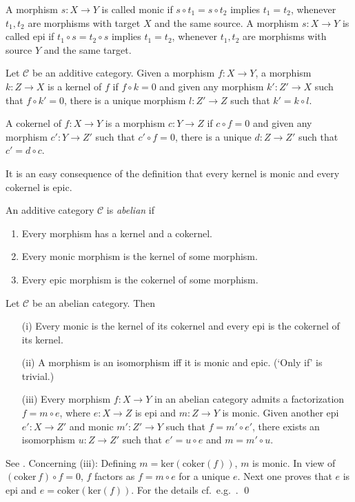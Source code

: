 \documentclass[11pt]{article}
\theoremstyle{definition}
\theoremstyle{definition}
\theoremstyle{remark}
\def\2#1{{\mathcal #1}}
\newcommand{\rarr}{\rightarrow}
\begin{document}
\bdefin {}
A morphism $s:X\rarr Y$ is called monic if $s\circ t_1=s\circ t_2$ implies $t_1=t_2$, whenever
$t_1,t_2$ are morphisms with target $X$ and the same source.
A morphism $s:X\rarr Y$ is called epi if $t_1\circ s=t_2\circ s$ implies $t_1=t_2$, whenever
$t_1,t_2$ are morphisms with source $Y$ and the same target.
\edefin

\bdefin {}
Let $\2C$ be an additive category. Given a morphism $f:X\rarr Y$, a morphism $k: Z\rarr X$ is a
kernel of $f$ if $f\circ k=0$ and given any morphism $k': Z'\rarr X$ such that $f\circ k'=0$, there
is a unique morphism $l:Z'\rarr Z$ such that $k'=k\circ l$.

A cokernel  of $f:X\rarr Y$ is a morphism $c: Y\rarr Z$ if $c\circ f=0$ and given any morphism 
$c': Y\rarr Z'$ such that $c'\circ f=0$, there is a unique $d: Z\rarr Z'$ such that $c'=d\circ c$.
\edefin

It is an easy consequence of the definition that every kernel is monic and every cokernel is epic.

\bdefin \label{def-abelian} 
An additive category $\2C$ is \emph{abelian} if
\begin{enumerate}
\item Every morphism has a kernel and a cokernel.
\item Every monic morphism is the kernel of some morphism.
\item Every epic morphism is the cokernel of some morphism.
\end{enumerate}
\edefin

\bprop \label{prop-me} Let $\2C$ be an abelian category. Then
\begin{itemize}
\item[(i)] Every monic is the kernel of its cokernel and every epi is the cokernel of its kernel.
\item[(ii)] A morphism is an isomorphism iff it is monic and epic. (`Only if' is trivial.)
\item[(iii)] Every morphism $f:X\rarr Y$ in an abelian category admits a factorization $f=m\circ e$,
where  $e:X\rarr Z$ is epi and  $m:Z\rarr Y$ is monic. Given another epi $e':X\rarr Z'$ and monic
$m':Z'\rarr Y$ such that $f=m'\circ e'$, there exists an isomorphism $u:Z\rarr Z'$ such that
$e'=u\circ e$ and $m=m'\circ u$.  
\end{itemize}
\eprop

\prf See \cite[Chapter VIII]{cwm}. Concerning (iii): Defining $m=\mathrm{ker}(\mathrm{coker}(f))$,
$m$ is monic. In view of $(\mathrm{coker}\,f)\circ f=0$, $f$ factors as $f=m\circ e$ for a unique
$e$. Next one proves that $e$ is epi and $e=\mathrm{coker}(\mathrm{ker}(f))$. For the details cf.\
e.g.\ \cite{cwm}. \qed 
\end{document}
